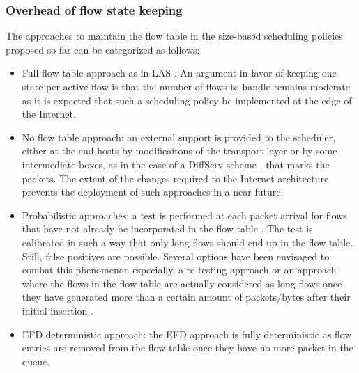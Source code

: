 \documentclass[preprint,12pt]{elsarticle}
\begin{document}



 

\subsubsection{Overhead of flow state keeping}\label{sec:table_size}
The approaches to maintain the flow table in the size-based scheduling policies proposed so far can be categorized as follows: %
\begin{itemize}
 \item Full flow table approach as in LAS \cite{Rai04size-basedscheduling}. An argument in favor of keeping one state per active flow is that the number of flows to handle remains moderate as it is expected that such a scheduling policy be implemented at the edge of the Internet.
\item No flow table approach: an external support is provided to the scheduler, either at the end-hosts by modificaitons of the transport layer \cite{Avrachenkov04Run2c} or by some intermediate boxes, as in the case of a DiffServ scheme \cite{Noureddine02improvingthe}, that marks the packets. The extent of the changes required to the Internet architecture prevents the deployment of such approaches in a near future.
\item Probabilistic approaches:  a test is performed at each packet arrival for flows that have not already be incorporated in the flow table \cite{DivakaranCAP10,Kortebi04Xprotect,Psounis05Sift}. The test is calibrated in such a way that only long flows should end up in the flow table. Still, false positives are possible. Several options have been envisaged to combat this phenomenon especially, a re-testing approach \cite{Psounis05Sift} or an approach where the flows in the flow table are actually considered as long flows once they have generated more than a certain amount of packets/bytes after their initial insertion \cite{DivakaranCAP10}.
\item EFD deterministic approach:  the EFD approach is fully deterministic as flow entries are removed from the flow table once they have no more packet in the queue. 
\end{itemize}
\end{document}
